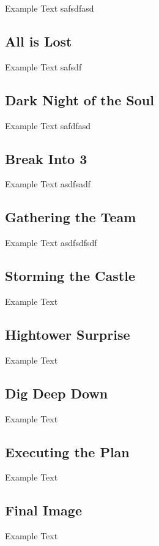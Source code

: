 \documentclass[12pt,a4paper,final,oneside]{book}
\begin{document}
Example Text
safsdfasd

\subsection{All is Lost}

Example Text
safsdf

\subsection{Dark Night of the Soul}

Example Text
safdfasd

\subsection{Break Into 3}

Example Text
asdfsadf

\subsection{Gathering the Team}

Example Text
asdfsdfsdf

\subsection{Storming the Castle}

Example Text

\subsection{Hightower Surprise}

Example Text

\subsection{Dig Deep Down}

Example Text

\subsection{Executing the Plan}

Example Text

\subsection{Final Image}

Example Text
\end{document}
